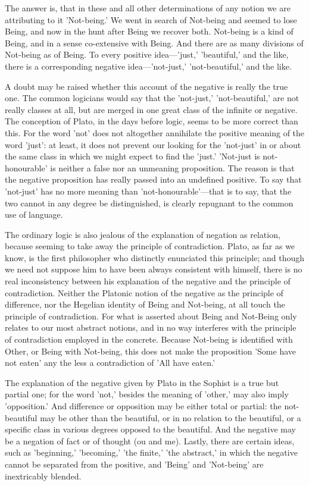 \documentclass[11pt,letter]{article}
\begin{document}
\par  The answer is, that in these and all other determinations of any notion we are attributing to it 'Not-being.' We went in search of Not-being and seemed to lose Being, and now in the hunt after Being we recover both. Not-being is a kind of Being, and in a sense co-extensive with Being. And there are as many divisions of Not-being as of Being. To every positive idea—'just,' 'beautiful,' and the like, there is a corresponding negative idea—'not-just,' 'not-beautiful,' and the like.

\par  A doubt may be raised whether this account of the negative is really the true one. The common logicians would say that the 'not-just,' 'not-beautiful,' are not really classes at all, but are merged in one great class of the infinite or negative. The conception of Plato, in the days before logic, seems to be more correct than this. For the word 'not' does not altogether annihilate the positive meaning of the word 'just': at least, it does not prevent our looking for the 'not-just' in or about the same class in which we might expect to find the 'just.' 'Not-just is not-honourable' is neither a false nor an unmeaning proposition. The reason is that the negative proposition has really passed into an undefined positive. To say that 'not-just' has no more meaning than 'not-honourable'—that is to say, that the two cannot in any degree be distinguished, is clearly repugnant to the common use of language.

\par  The ordinary logic is also jealous of the explanation of negation as relation, because seeming to take away the principle of contradiction. Plato, as far as we know, is the first philosopher who distinctly enunciated this principle; and though we need not suppose him to have been always consistent with himself, there is no real inconsistency between his explanation of the negative and the principle of contradiction. Neither the Platonic notion of the negative as the principle of difference, nor the Hegelian identity of Being and Not-being, at all touch the principle of contradiction. For what is asserted about Being and Not-Being only relates to our most abstract notions, and in no way interferes with the principle of contradiction employed in the concrete. Because Not-being is identified with Other, or Being with Not-being, this does not make the proposition 'Some have not eaten' any the less a contradiction of 'All have eaten.'

\par  The explanation of the negative given by Plato in the Sophist is a true but partial one; for the word 'not,' besides the meaning of 'other,' may also imply 'opposition.' And difference or opposition may be either total or partial: the not-beautiful may be other than the beautiful, or in no relation to the beautiful, or a specific class in various degrees opposed to the beautiful. And the negative may be a negation of fact or of thought (ou and me). Lastly, there are certain ideas, such as 'beginning,' 'becoming,' 'the finite,' 'the abstract,' in which the negative cannot be separated from the positive, and 'Being' and 'Not-being' are inextricably blended.
\end{document}

